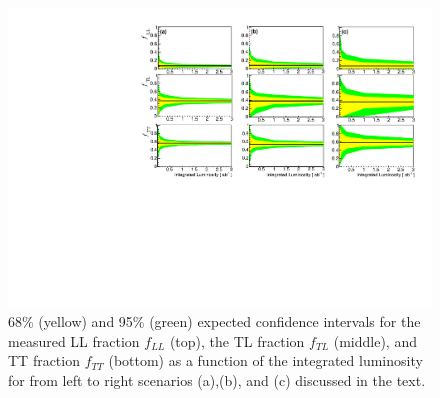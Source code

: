 \documentclass[aps,prl,twocolumn,showpacs,superscriptaddress,groupeaddress,floatfix]{revtex4}
\begin{document}
\begin{figure}[h]
\includegraphics[width=.9\textwidth]{fig_04.pdf}
\caption{ \label{fig:sensitivity} 68\% (yellow) and 95\% (green) expected confidence intervals for the measured LL fraction $f_{LL}$ (top), the TL fraction $f_{TL}$ (middle), and TT fraction $f_{TT}$ (bottom) as a function of the integrated luminosity for from left to right scenarios (a),(b), and (c) discussed in the text.}
\end{figure}
\clearpage


\end{document}
